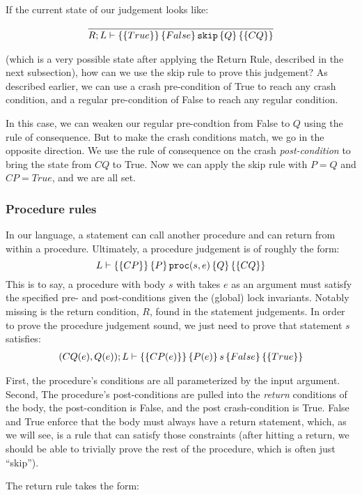 If the current state of our judgement looks like:

\begin{gather*}
\infer{\hoarestmt{R}{L}{True}{False}{\texttt{skip}}{Q}{CQ}}{}
\end{gather*}

(which is a very possible state after applying the Return Rule, described in the
next subsection), how can we use the skip rule to prove this judgement? As
described earlier, we can use a crash pre-condition of True to reach any crash
condition, and a regular pre-condition of False to reach any regular condition.

In this case, we can weaken our regular pre-condtion from False to $Q$
using the rule of consequence.
But to make the crash conditions match, we go in
the opposite direction.
We use the rule of consequence on the crash
\textit{post-condition} to bring the state from $CQ$ to True.
Now we can apply
the skip rule with $P=Q$ and $CP=True$, and we are all set.

\subsubsection{Procedure rules}

In our language, a statement can call another procedure and can return from
within a procedure.
Ultimately, a procedure judgement is of roughly the form:
$$L \vdash \left\{\left\{ CP \right\}\right\} \left\{ P \right\} \texttt{proc}(s, e) \left\{ Q \right\} \left\{\left\{ CQ \right\}\right\}$$
This is to say, a procedure with body $s$ with takes $e$ as an argument must
satisfy the specified pre- and post-conditions given the (global) lock
invariants.
Notably missing is the return condition, $R$, found in the statement
judgements.
In order to prove the procedure judgement sound, we just need to
prove that statement $s$ satisfies:
\begin{gather*}
(CQ(e),Q(e)); L \vdash \left\{\left\{ CP(e) \right\}\right\} \left\{ P(e) \right\} s \left\{ False \right\} \left\{\left\{ True \right\}\right\}
\end{gather*}

First, the procedure's conditions are all parameterized by the input argument.
Second, The procedure's post-conditions are pulled into the \textit{return}
conditions of the body, the post-condition is False, and the post
crash-condition is True.
False and True enforce that the body must always have a
return statement, which, as we will see, is a rule that can satisfy those
constraints (after hitting a return, we should be able to trivially prove the
rest of the procedure, which is often just ``skip'').

The return rule takes the form:

